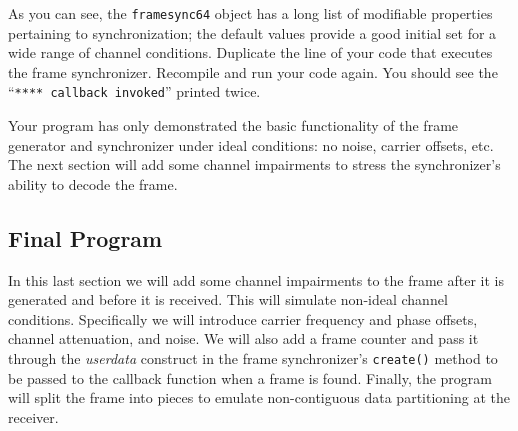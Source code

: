 %
As you can see, the {\tt framesync64} object has a long list of
modifiable properties pertaining to synchronization;
the default values provide a good initial set for a wide range of
channel conditions.
Duplicate the line of your code that executes the frame synchronizer.
Recompile and run your code again.
You should see the ``{\tt ***** callback invoked}'' printed twice.

Your program has only demonstrated the basic functionality of the frame
generator and synchronizer under ideal conditions:
no noise, carrier offsets, etc.
The next section will add some channel impairments to stress the
synchronizer's ability to decode the frame.


%
%
\subsection{Final Program}
\label{tutorial:framing:completed}

In this last section we will add some channel impairments to the frame
after it is generated and before it is received.
This will simulate non-ideal channel conditions.
Specifically we will introduce carrier frequency and phase offsets,
channel attenuation, and noise.
We will also add a frame counter and pass it through the {\em userdata}
construct in the frame synchronizer's {\tt create()} method to be passed
to the callback function when a frame is found.
Finally, the program will split the frame into pieces to emulate
non-contiguous data partitioning at the receiver.


